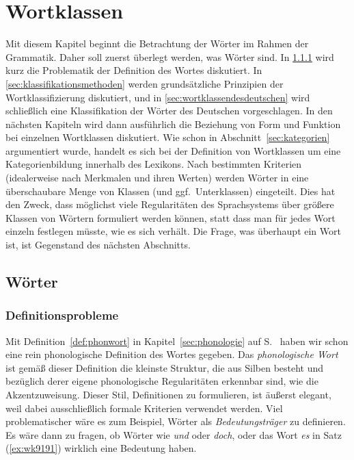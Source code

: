 \chapter{Wortklassen}

\label{sec:wortklassen}

Mit diesem Kapitel beginnt die Betrachtung der Wörter im Rahmen der Grammatik.
Daher soll zuerst überlegt werden, was Wörter sind.
In \ref{sec:definitionsproblemewort} wird kurz die Problematik der Definition des Wortes diskutiert.
In \ref{sec:klassifikationsmethoden} werden grundsätzliche Prinzipien der Wortklassifizierung diskutiert, und in \ref{sec:wortklassendesdeutschen} wird schließlich eine Klassifikation der Wörter des Deutschen vorgeschlagen.
In den nächsten Kapiteln wird dann ausführlich die Beziehung von Form und Funktion bei einzelnen Wortklassen diskutiert.
Wie schon in Abschnitt~\ref{sec:kategorien} argumentiert wurde, handelt es sich bei der Definition von Wortklassen um eine Kategorienbildung innerhalb des Lexikons.
Nach bestimmten Kriterien (idealerweise nach Merkmalen und ihren Werten) werden Wörter in eine überschaubare Menge von Klassen (und ggf.\ Unterklassen) eingeteilt.
Dies hat den Zweck, dass möglichst viele Regularitäten des Sprachsystems über größere Klassen von Wörtern formuliert werden können, statt dass man für jedes Wort einzeln festlegen müsste, wie es sich verhält.
Die Frage, was überhaupt ein Wort ist, ist Gegenstand des nächsten Abschnitts.

\section{Wörter}

\label{sec:woerter}

\subsection{Definitionsprobleme}

\label{sec:definitionsproblemewort}


Mit Definition~\ref{def:phonwort} in Kapitel~\ref{sec:phonologie} auf S.~\pageref{def:phonwort} haben wir schon eine rein phonologische Definition des Wortes gegeben.
Das \textit{phonologische Wort} ist gemäß dieser Definition die kleinste Struktur, die aus Silben besteht und bezüglich derer eigene phonologische Regularitäten erkennbar sind, wie \zB die Akzentzuweisung.
Dieser Stil, Definitionen zu formulieren, ist äußerst elegant, weil dabei ausschließlich formale Kriterien verwendet werden.
Viel problematischer wäre es zum Beispiel, Wörter als \textit{Bedeutungsträger} zu definieren.
Es wäre dann zu fragen, ob Wörter wie \textit{und} oder \textit{doch}, oder das Wort \textit{es} in Satz (\ref{ex:wk9191}) wirklich eine Bedeutung haben.

